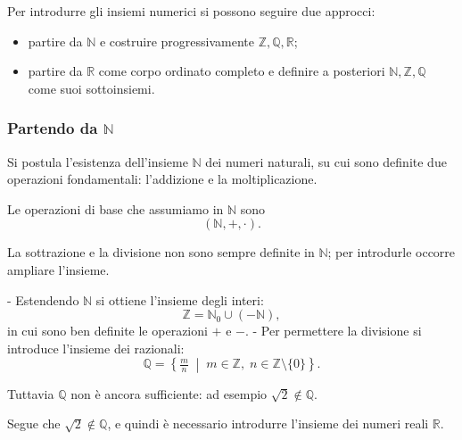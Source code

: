 Per introdurre gli insiemi numerici si possono seguire due approcci:
\begin{itemize}
\item partire da $\mathbb{N}$ e costruire progressivamente $\mathbb{Z}, \mathbb{Q}, \mathbb{R}$;
\item partire da $\mathbb{R}$ come corpo ordinato completo e definire a posteriori $\mathbb{N}, \mathbb{Z}, \mathbb{Q}$ come suoi sottoinsiemi.
\end{itemize}


\subsubsection{Partendo da $\mathbb{N}$}
Si postula l'esistenza dell'insieme $\mathbb{N}$ dei numeri naturali, su cui sono definite due operazioni fondamentali: l'addizione e la moltiplicazione.


Le operazioni di base che assumiamo in $\mathbb{N}$ sono
\[
(\mathbb{N}, +, \cdot).
\]

La sottrazione e la divisione non sono sempre definite in $\mathbb{N}$; per introdurle occorre ampliare l’insieme.

- Estendendo $\mathbb{N}$ si ottiene l’insieme degli interi:
  \[
  \mathbb{Z} = \mathbb{N}_{0} \cup (-\mathbb{N}),
  \]
  in cui sono ben definite le operazioni $+$ e $-$.
- Per permettere la divisione si introduce l’insieme dei razionali:
  \[
  \mathbb{Q} = \left\{ \tfrac{m}{n} \;\middle|\; m \in \mathbb{Z}, \; n \in \mathbb{Z}\setminus\{0\} \right\}.
  \]

Tuttavia $\mathbb{Q}$ non è ancora sufficiente: ad esempio $\sqrt{2} \notin \mathbb{Q}$.



Segue che $\sqrt{2} \notin \mathbb{Q}$, e quindi è necessario introdurre l’insieme dei numeri reali $\mathbb{R}$.



